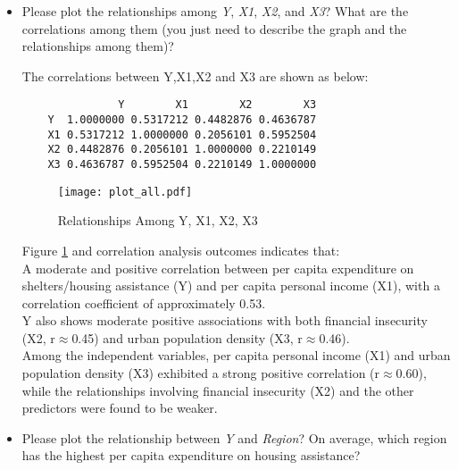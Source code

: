 \documentclass[12pt,letterpaper]{article}
\begin{document}
	\begin{itemize}
		
		\item
		Please plot the relationships among \emph{Y}, \emph{X1}, \emph{X2}, and \emph{X3}? What are the correlations among them (you just need to describe the graph and the relationships among them)?
		
		\vspace{.5cm}
		
		
	The correlations between Y,X1,X2 and X3 are shown as below:
	\begin{verbatim}
	           Y        X1        X2        X3
	Y  1.0000000 0.5317212 0.4482876 0.4636787
	X1 0.5317212 1.0000000 0.2056101 0.5952504
	X2 0.4482876 0.2056101 1.0000000 0.2210149
	X3 0.4636787 0.5952504 0.2210149 1.0000000
	\end{verbatim}
		
  \begin{figure}[H]
	\centering
	\texttt{[image: plot\_all.pdf]}
	\caption{\footnotesize Relationships Among Y, X1, X2, X3}
	\label{fig:plot_1}
   \end{figure}
	
	
	Figure \ref{fig:plot_1} and correlation analysis outcomes indicates that:\\
	A moderate and positive correlation between per capita expenditure on shelters/housing assistance (Y) and per capita personal income (X1), with a correlation coefficient of approximately 0.53.\\
	Y also shows moderate positive associations with both financial insecurity (X2, r$\approx$0.45) and urban population density (X3, r$\approx$0.46).\\
	Among the independent variables, per capita personal income (X1) and urban population density (X3) exhibited a strong positive correlation (r$\approx$0.60), while the relationships involving financial insecurity (X2) and the other predictors were found to be weaker.
	
	\newpage
		
		\item
		Please plot the relationship between \emph{Y} and \emph{Region}? On average, which region has the highest per capita expenditure on housing assistance?
		
		\vspace{.5cm}
		
		\vspace{.2cm}
		

\end{itemize}
\end{document}
